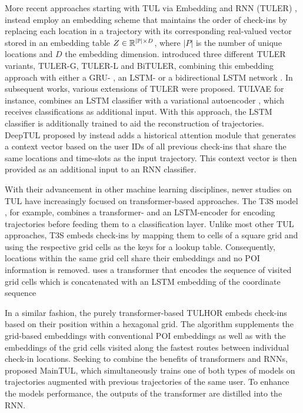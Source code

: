 \documentclass{article} %
\theoremstyle{definition}
\begin{document}
More recent approaches starting with TUL via Embedding and RNN (TULER) \citep{gaoIdentifyingHumanMobility2017}, instead employ an embedding scheme that maintains the order of check-ins by replacing each location in a trajectory with its corresponding real-valued vector stored in an embedding table $Z \in {\mathbb{R}}^{|{\mathbb{P}}| \times D}$, where $|P|$ is the number of unique locations and $D$ the embedding dimension.
\citet{gaoIdentifyingHumanMobility2017} introduced three different TULER variants, TULER-G, TULER-L and BiTULER, combining this embedding approach with either a GRU- \citep{choPropertiesNeuralMachine2014a}, an LSTM- or a bidirectional LSTM network \citep{hochreiterLongShort1997}.
In subsequent works, various extensions of TULER were proposed.
TULVAE \citep{zhouTrajectoryUserLinkingVariational2018} for instance, combines an LSTM classifier with a variational autoencoder \citep{kingmaAutoEncodingVariationalBayes2013a}, which receives classifications as additional input.
With this approach, the LSTM classifier is additionally trained to aid the reconstruction of trajectories.
DeepTUL proposed by \citet{miaoTrajectoryUserLinkingAttentive2020} instead adds a historical attention module that generates a context vector based on the user IDs of all previous check-ins that share the same locations and time-slots as the input trajectory.
This context vector is then provided as an additional input to an RNN classifier.

With their advancement in other machine learning disciplines, newer studies on TUL have increasingly focused on transformer-based approaches.
The T3S model \citep{yangT3SEffectiveRepresentation2021}, for example, combines a transformer- and an LSTM-encoder for encoding trajectories before feeding them to a classification layer.
Unlike most other TUL approaches, T3S embeds check-ins by mapping them to cells of a square grid and using the respective grid cells as the keys for a lookup table.
Consequently, locations within the same grid cell share their embeddings and no POI information is removed.
uses a transformer that encodes the sequence of visited grid cells which is concatenated with an LSTM embedding of the coordinate sequence

In a similar fashion, the purely transformer-based TULHOR \citep{alsaeedTrajectoryUserLinkingUsing2023a} embeds check-ins based on their position within a hexagonal grid.
The algorithm supplements the grid-based embeddings with conventional POI embeddings as well as with the embeddings of the grid cells visited along the fastest routes between individual check-in locations.
Seeking to combine the benefits of transformers and RNNs, \citet{chenMutualDistillationLearning2022a} proposed MainTUL, which simultaneously trains one of both types of models on trajectories augmented with previous trajectories of the same user.
To enhance the models performance, the outputs of the transformer are distilled into the RNN.
\end{document}
